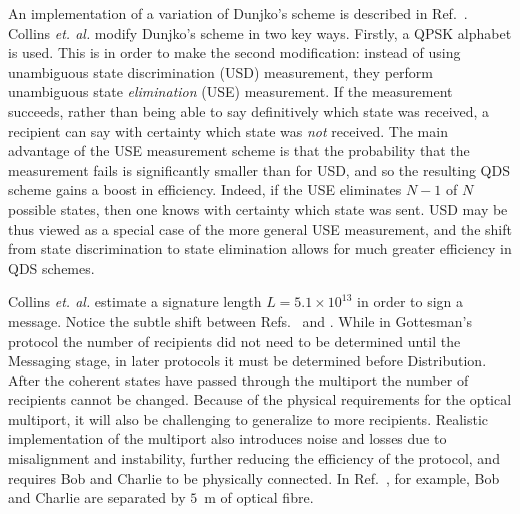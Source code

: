 An implementation of a variation of Dunjko's scheme is described in Ref.~\cite{Collins2014}. Collins \emph{et. al.} modify Dunjko's scheme in two key ways. Firstly, a QPSK alphabet is used. This is in order to make the second modification: instead of using unambiguous state discrimination (USD) measurement, they perform unambiguous state \emph{elimination} (USE) measurement. If the measurement succeeds, rather than being able to say definitively which state was received, a recipient can say with certainty which state was \emph{not} received. %
The main advantage of the USE measurement scheme is that the probability that the measurement fails is significantly smaller than for USD, and so the resulting QDS scheme gains a boost in efficiency. Indeed, if the USE eliminates $N-1$ of $N$ possible states, then one knows with certainty which state was sent. USD may be thus viewed as a special case of the more general USE measurement, and the shift from state discrimination to state elimination allows for much greater efficiency in QDS schemes. %



Collins \emph{et. al.} estimate a signature length $L = 5.1 \times 10^{13}$ in order to sign a message. Notice the subtle shift between Refs.~\cite{Gottesman2001} and \cite{Andersson2006, Clarke2012, Dunjko2014, Collins2014}. While in Gottesman's protocol the number of recipients did not need to be determined until the Messaging stage, in later protocols it must be determined before Distribution. After the coherent states have passed through the multiport the number of recipients cannot be changed. 
Because of the physical requirements for the optical multiport, it will also be challenging to generalize to more recipients. %
Realistic implementation of the multiport also introduces noise and losses due to misalignment and instability, further reducing the efficiency of the protocol, and requires Bob and Charlie to be physically connected. In Ref.~\cite{Clarke2012, Collins2014}, for example, Bob and Charlie are separated by $5$~m of optical fibre. 




